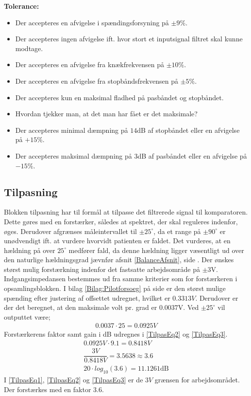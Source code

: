 \textbf{Tolerance:}
\begin{itemize}
	\item Der accepteres en afvigelse i spændingsforsyning på $\pm9\%$.
	\item Der accepteres ingen afvigelse ift. hvor stort et inputsignal filtret skal kunne modtage.
	\item Der accepteres en afvigelse fra knækfrekvensen på $\pm10\%$.
	\item Der accepteres en afvigelse fra stopbåndsfrekvensen på $\pm5\%$.
	\item Der accepteres kun en maksimal fladhed på pasbåndet og stopbåndet.\item{Hvordan tjekker man, at det man har fået er det maksimale?}
	\item Der accepteres minimal dæmpning på $14$dB af stopbåndet eller en afvigelse på $+15\%$.
	\item Der accepteres maksimal dæmpning på $3$dB af pasbåndet eller en afvigelse på $-15\%$.
\end{itemize}
\subsection{Tilpasning}\label{Tilpasningsblok}
Blokken tilpasning har til formål at tilpasse det filtrerede signal til komparatoren. Dette gøres med en forstærker, således at spektret, der skal reguleres indenfor, øges. Derudover afgrænses måleintervallet til $\pm25^{\circ}$, da et range på $\pm90^{\circ}$ er unødvendigt ift. at vurdere hvorvidt patienten er faldet. Det vurderes, at en hældning på over $25^{\circ}$ medfører fald, da denne hældning ligger væsentligt ud over den naturlige hældningsgrad jævnfør afsnit \ref{BalanceAfsnit}, side \pageref{BalanceAfsnit}. Der ønskes størst mulig forstærkning indenfor det fastsatte arbejdsområde på $\pm3$V. Indgangsimpedansen bestemmes ud fra samme kriterier som for forstærkeren i opsamlingsblokken. I bilag \ref{Bilag:Pilotforsoeg} på side \pageref{Bilag:Pilotforsoeg} er den størst mulige spænding efter justering af offsettet udregnet, hvilket er $0.3313V$. Derudover er der det beregnet, at den maksimale volt pr. grad er $0.0037$V. Ved $\pm25^{\circ}$ vil outputtet være;
\begin{align}
\label{Udreg3} 0.0037 \cdot 25 = 0.0925V
\end{align}
Forstærkerens faktor samt gain i dB udregnes i \eqref{TilpasEq2} og \eqref{TilpasEq3}.
\begin{align}
\label{TilpasEq1} 0.0925V \cdot 9.1 = 0.8418V \\
\label{TilpasEq2} \dfrac{3V}{0.8418V} = 3.5638 \approx 3.6 \\
\label{TilpasEq3} 20 \cdot log_{10} (3.6) = 11.1261\text{dB}
\end{align} 
I \eqref{TilpasEq1}, \eqref{TilpasEq2} og \eqref{TilpasEq3} er de $3V$ grænsen for arbejdsområdet. Der forstærkes med en faktor $3.6$. \\

